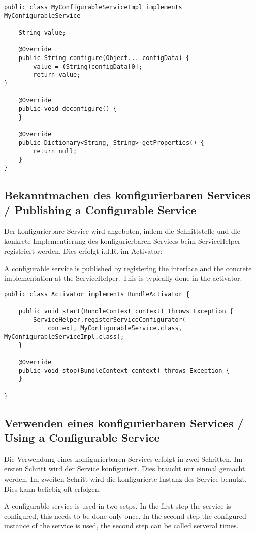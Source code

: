 \documentclass[10pt,a4paper]{scrartcl}
\providecommand{\deng}[2]{#1 / {\sffamily #2}}
\providecommand{\deutsch}[1]{#1}
\providecommand{\englisch}[1]{{\sffamily #1}}
\begin{document}
\begin{lstlisting}
public class MyConfigurableServiceImpl implements MyConfigurableService	

	String value;
	
	@Override
	public String configure(Object... configData) {
		value = (String)configData[0];
		return value;
}

	@Override
	public void deconfigure() {
	}

	@Override
	public Dictionary<String, String> getProperties() {
		return null;
	}
}
\end{lstlisting}


\subsection{\deng{Bekanntmachen des konfigurierbaren Services}{Publishing a Configurable Service}}
\deutsch{Der konfigurierbare Service wird angeboten, indem die Schnittstelle und die 
konkrete Implementierung des konfigurierbaren Services beim ServiceHelper 
registriert werden. Dies erfolgt i.d.R. im Activator:}

\englisch{A configurable service is published by registering the interface and the concrete implementation at the ServiceHelper. This is typically done in the activator:}

\begin{lstlisting}
public class Activator implements BundleActivator {

	public void start(BundleContext context) throws Exception {
		ServiceHelper.registerServiceConfigurator(
			context, MyConfigurableService.class, MyConfigurableServiceImpl.class);
	}
	
	@Override
	public void stop(BundleContext context) throws Exception {
	}

}
\end{lstlisting}

\subsection{\deng{Verwenden eines konfigurierbaren Services}{Using a Configurable Service}}
\deutsch{Die Verwendung eines konfigurierbaren Services erfolgt in zwei Schritten.
Im ersten Schritt wird der Service konfiguriert. Dies braucht nur einmal
gemacht werden. Im zweiten Schritt wird die konfigurierte Instanz des Service
benutzt. Dies kann beliebig oft erfolgen.}

\englisch{A configurable service is used in two setps. In the first step the
service is configured, this needs to be done only once. In the second step the
configured instance of the service is used, the second step can be called
serveral times.}
\end{document}
